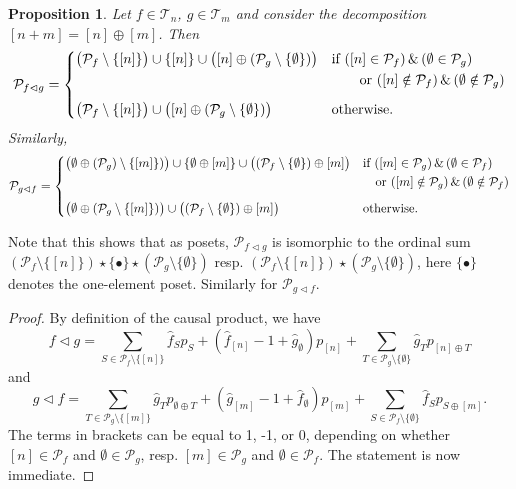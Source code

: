\documentclass[12pt]{article}
\newtheorem{prop}{Proposition}
\theoremstyle{definition}
\theoremstyle{remark}
\def\Te{\mathcal T}
\def\Pe{\mathcal P}
\def\vtl{\vartriangleleft}
\begin{document}
\begin{prop}\label{prop:vtl_ordinal} Let $f\in \Te_{n}$, $g\in \Te_{m}$ and
consider the decomposition $[n+m]=[n]\oplus[m]$. Then  
\[
\Pe_{f\vtl g}=\begin{dcases}\bigl(\Pe_{f}\setminus \{[n]\}\bigr) \cup  \{[n]\} \cup \bigl([n]\oplus
(\Pe_{g}\setminus \{\emptyset\})\bigr)& \text{if } ([n]\in \Pe_{f})\, \&\, (\emptyset\in
\Pe_{g})\\  \ & \qquad \text{or } ([n]\notin \Pe_{f})\, \&\, (\emptyset\notin
\Pe_{g})\\[5pt]
\bigl(\Pe_{f}\setminus \{[n]\}\bigr) \cup \bigl([n]\oplus
(\Pe_{g}\setminus \{\emptyset\})\bigr) & \text{otherwise}.
\end{dcases}
\]
Similarly,
\[
\Pe_{g\vtl f}=\begin{dcases}\bigl(\emptyset \oplus (\Pe_{g})\setminus
\{[m]\})\bigr) \cup  \{\emptyset\oplus [m]\} \cup \bigl((\Pe_{f}\setminus
\{\emptyset\})\oplus [m]\bigr)& \text{if } ([m]\in \Pe_{g})\, \&\, (\emptyset\in
\Pe_{f})\\  \ & \quad \text{or } ([m]\notin \Pe_{g})\, \&\, (\emptyset\notin
\Pe_{f})\\[5pt]
\bigl(\emptyset\oplus (\Pe_{g}\setminus \{[m]\})\bigr) \cup \bigl((\Pe_{f}\setminus
\{\emptyset\})\oplus[m]\bigr) & \text{otherwise}.
\end{dcases}
\]

\end{prop}

Note that this shows that as posets, $\Pe_{f\vtl g}$ is isomorphic to the ordinal sum
$(\Pe_f\setminus\{[n]\}) \star \{\bullet\}\star (\Pe_g\setminus\{\emptyset\})$ 
resp. $(\Pe_f\setminus\{[n]\})\star (\Pe_g\setminus\{\emptyset\})$, 
here $\{\bullet\}$ denotes the one-element poset. Similarly for $\Pe_{g\vtl f}$.


\begin{proof} By definition of the causal product, we have  
\[
f\vtl g=\sum_{S\in \Pe_f\setminus\{[n]\}} \hat f_Sp_S+ (\hat f_{[n]}-1 + \hat
g_\emptyset)p_{[n]}+\sum_{T\in \Pe_g\setminus \{\emptyset\}} \hat g_T p_{[n]\oplus T}
\]
and 
\[
g\vtl f=\sum_{T\in \Pe_g\setminus\{[m]\}} \hat g_Tp_{\emptyset\oplus T}+ (\hat g_{[m]}-1 + \hat
f_\emptyset)p_{[m]}+\sum_{S\in \Pe_f\setminus \{\emptyset\}} \hat f_S p_{S\oplus [m]}.
\]
The terms in brackets can be equal to 1, -1, or 0, depending on whether $[n]\in \Pe_f$ and
$\emptyset\in \Pe_g$, resp. $[m]\in \Pe_g$ and $\emptyset 
\in \Pe_f$. The statement is now immediate.


\end{proof}
\end{document}
